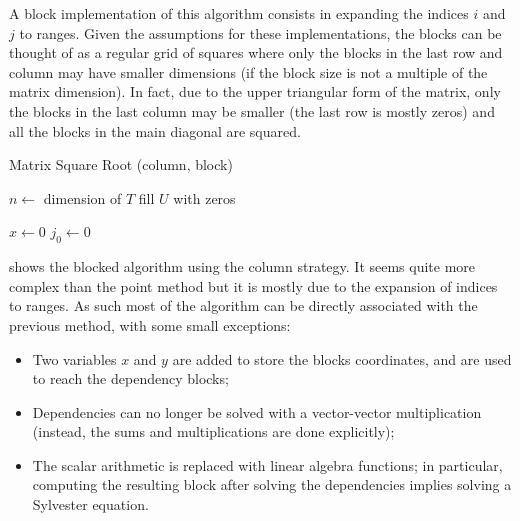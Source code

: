 \documentclass[../thesis]{subfiles}
\begin{document}
	A block implementation of this algorithm consists in expanding the indices $i$ and $j$ to ranges. Given the assumptions for these implementations, the blocks can be thought of as a regular grid of squares where only the blocks in the last row and column may have smaller dimensions (if the block size is not a multiple of the matrix dimension). In fact, due to the upper triangular form of the matrix, only the blocks in the last column may be smaller (the last row is mostly zeros) and all the blocks in the main diagonal are squared.

	\begin{algorithm}[p]
		\caption{Matrix Square Root (column, block)}
		\label{alg:sqrtm:column:block}
		\DontPrintSemicolon


		$n \leftarrow$ dimension of $T$\;
		fill $U$ with zeros\;

		$x \leftarrow 0$\;
		$j_0 \leftarrow 0$\;
	\end{algorithm}

	 shows the blocked algorithm using the column strategy. It seems quite more complex than the point method but it is mostly due to the expansion of indices to ranges. As such most of the algorithm can be directly associated with the previous method, with some small exceptions:
	\begin{itemize}
		\item Two variables $x$ and $y$ are added to store the blocks coordinates, and are used to reach the dependency blocks;
		\item Dependencies can no longer be solved with a vector-vector multiplication (instead, the sums and multiplications are done explicitly);
		\item The scalar arithmetic is replaced with linear algebra functions; in particular, computing the resulting block after solving the dependencies implies solving a Sylvester equation.
	\end{itemize}
\end{document}
